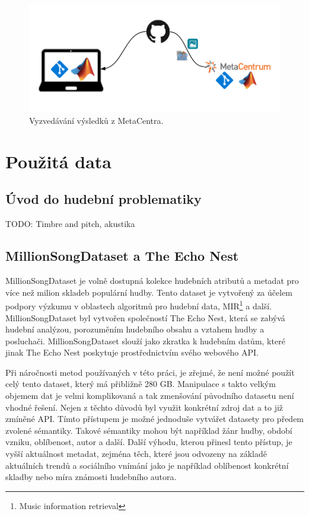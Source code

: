 \documentclass[thesis=M,czech]{FITthesis}[2012/06/26]
\begin{document}
\begin{figure}[htbp]
\begin{center}
	\includegraphics[scale=0.9]{down.png}
\caption{Vyzvedávání výsledků z MetaCentra.}
\label{fig:down}
\end{center}
\end{figure}


\chapter{Použitá data}
\section{Úvod do hudební problematiky}
TODO: Timbre and  pitch, akustika



\section{MillionSongDataset a The Echo Nest}
MillionSongDataset je volně dostupná kolekce hudebních atributů a metadat pro více než milion skladeb populární hudby. Tento dataset je vytvořený za účelem podpory výzkumu v oblastech algoritmů pro hudební data, MIR\footnote{Music information retrieval} a další. MillionSongDataset byl vytvořen společností The Echo Nest, která se zabývá hudební analýzou, porozuměním hudebního obsahu a vztahem hudby a posluchači. MillionSongDataset slouží jako zkratka k hudebním datům, které jinak The Echo Nest poskytuje prostřednictvím svého webového API.

	Při náročnosti metod používaných v této práci, je zřejmé, že není možné použít celý tento dataset, který má přibližně 280 GB. Manipulace s takto velkým objemem dat je velmi komplikovaná a tak zmenšování původního datasetu není vhodné řešení. Nejen z těchto důvodů byl využit konkrétní zdroj dat a to již zmíněné API. Tímto přístupem je možné jednoduše vytvářet datasety pro předem zvolené sémantiky. Takové sémantiky mohou být například žánr hudby, období vzniku, oblíbenost, autor a další. Další výhodu, kterou přinesl tento přístup, je vyšší aktuálnost metadat, zejména těch, které jsou odvozeny na základě aktuálních trendů a sociálního vnímání jako je například oblíbenost konkrétní skladby nebo míra známosti hudebního autora.
	
\end{document}
